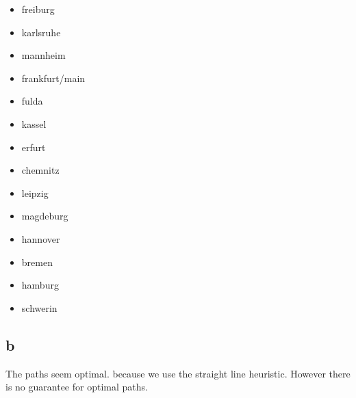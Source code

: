 \documentclass[a4paper]{article}
\begin{document}
\begin{itemize}
\begin{itemize}
			\item freiburg
			\item karlsruhe
			\item mannheim
			\item frankfurt/main
			\item fulda
			\item kassel
			\item erfurt
			\item chemnitz
			\item leipzig
			\item magdeburg
			\item hannover
			\item bremen
			\item hamburg
			\item schwerin
		\end{itemize}
	
		
	\end{itemize}
\subsection*{b} 
	The paths seem optimal. because we use the straight line heuristic. However there is no guarantee for optimal paths.
\end{document}

